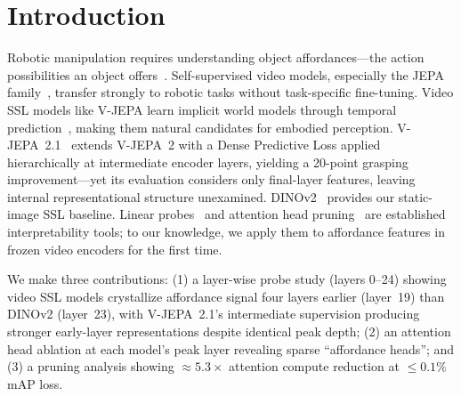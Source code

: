\section{Introduction}
\label{sec:intro}

Robotic manipulation requires understanding object affordances---the action possibilities
an object offers~\cite{myers2015affordance}.
Self-supervised video models, especially the JEPA family~\cite{bardes2025vjepa2},
transfer strongly to robotic tasks without task-specific fine-tuning.
Video SSL models like V-JEPA learn implicit world models through temporal prediction~\cite{lecun2022jepa}, making them natural candidates for embodied perception.
V-JEPA~2.1~\cite{bardes2026vjepa21} extends V-JEPA~2 with a Dense Predictive Loss applied
hierarchically at intermediate encoder layers, yielding a 20-point grasping improvement---yet
its evaluation considers only final-layer features, leaving internal representational structure unexamined.
DINOv2~\cite{oquab2024dinov2} provides our static-image SSL baseline.
Linear probes~\cite{alain2016probes} and attention head pruning~\cite{michel2019sixteen,elhage2021circuits}
are established interpretability tools; to our knowledge, we apply them to affordance features in frozen
video encoders for the first time.

We make three contributions:
(1) a layer-wise probe study (layers 0--24) showing video SSL models crystallize affordance
signal four layers earlier (layer~19) than DINOv2 (layer~23), with V-JEPA~2.1's intermediate
supervision producing stronger early-layer representations despite identical peak depth;
(2) an attention head ablation at each model's peak layer revealing sparse ``affordance heads''; and
(3) a pruning analysis showing ${\approx}5.3{\times}$ attention compute reduction at ${\leq}0.1\%$ mAP loss.
